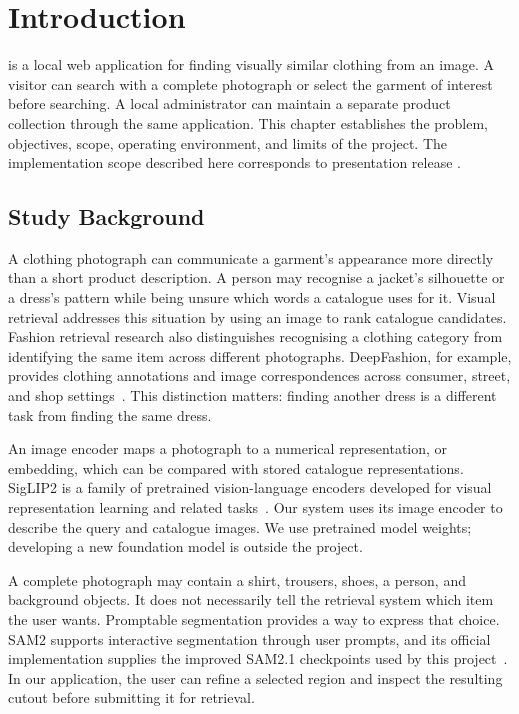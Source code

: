 \chapter{Introduction}
\label{ch:introduction}

\ProjectTitle{} is a local web application for finding visually similar clothing
from an image. A visitor can search with a complete photograph or select the
garment of interest before searching. A local administrator can maintain a
separate product collection through the same application. This chapter establishes
the problem, objectives, scope, operating environment, and limits of the project.
The implementation scope described here corresponds to presentation release
\texttt{\ApplicationRelease}.

\section{Study Background}
\label{sec:study-background}

A clothing photograph can communicate a garment's appearance more directly than
a short product description. A person may recognise a jacket's silhouette or a
dress's pattern while being unsure which words a catalogue uses for it. Visual
retrieval addresses this situation by using an image to rank catalogue candidates.
Fashion retrieval research also distinguishes recognising a clothing category
from identifying the same item across different photographs. DeepFashion, for
example, provides clothing annotations and image correspondences across consumer,
street, and shop settings~\cite{Liu2016DeepFashion}. This distinction matters:
finding another dress is a different task from finding the same dress.

An image encoder maps a photograph to a numerical representation, or embedding,
which can be compared with stored catalogue representations. SigLIP2 is a family
of pretrained vision-language encoders developed for visual representation
learning and related tasks~\cite{Tschannen2025SigLIP2}. Our system uses its image
encoder to describe the query and catalogue images. We use pretrained model
weights; developing a new foundation model is outside the project.

A complete photograph may contain a shirt, trousers, shoes, a person, and
background objects. It does not necessarily tell the retrieval system which item
the user wants. Promptable segmentation provides a way to express that choice.
SAM2 supports interactive segmentation through user prompts, and its official
implementation supplies the improved SAM2.1 checkpoints used by this
project~\cite{Ravi2024SAM2,MetaSAM2Repository}. In our application, the user can
refine a selected region and inspect the resulting cutout before submitting it
for retrieval.

